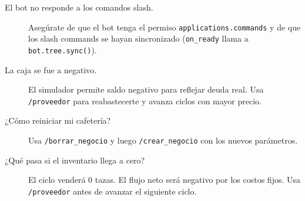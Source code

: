 \documentclass[12pt,spanish]{article}
\begin{document}
\begin{description}
  \item[El bot no responde a los comandos slash.]
    Asegúrate de que el bot tenga el permiso \texttt{applications.commands}
    y de que los slash commands se hayan sincronizado (\texttt{on\_ready}
    llama a \texttt{bot.tree.sync()}).

  \item[La caja se fue a negativo.]
    El simulador permite saldo negativo para reflejar deuda real.
    Usa \texttt{/proveedor} para reabastecerte y avanza ciclos con mayor precio.

  \item[¿Cómo reiniciar mi cafetería?]
    Usa \texttt{/borrar\_negocio} y luego \texttt{/crear\_negocio} con los
    nuevos parámetros.

  \item[¿Qué pasa si el inventario llega a cero?]
    El ciclo venderá 0 tazas. El flujo neto será negativo por los costos fijos.
    Usa \texttt{/proveedor} antes de avanzar el siguiente ciclo.
\end{description}
\end{document}
